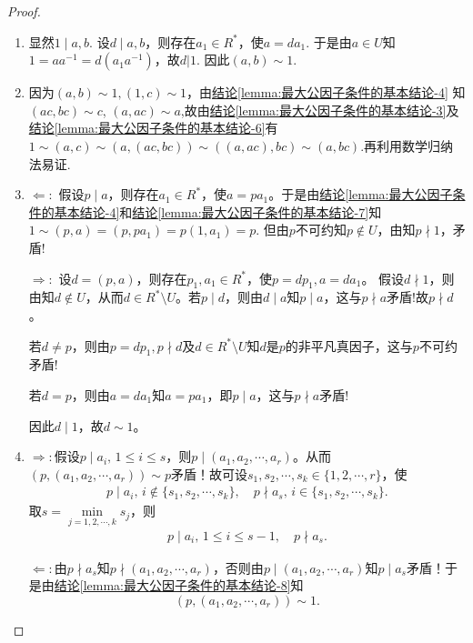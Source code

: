\documentclass[../../main.tex]{subfiles}%
\begin{document}
\begin{proof}
\begin{enumerate}[(1)]
\item 显然$1\mid a,b$. 设$d\mid a,b$，则存在$a_1\in R^*$，使$a=da_1$. 于是由$a\in U$知$1=aa^{-1}=d\left( a_1a^{-1} \right)$，故$d|1$. 因此$\left( a,b \right) \sim 1$.

\item 因为\( (a, b) \sim 1 ,(1,c)\sim 1\)，由\hyperref[lemma:最大公因子条件的基本结论-4]{结论\ref{lemma:最大公因子条件的基本结论-4}} 知 \( (ac, bc) \sim c \), \( (a, ac) \sim a \),故由\hyperref[lemma:最大公因子条件的基本结论-3]{结论\ref{lemma:最大公因子条件的基本结论-3}}及\hyperref[lemma:最大公因子条件的基本结论-6]{结论\ref{lemma:最大公因子条件的基本结论-6}}有 \( 1 \sim (a, c) \sim (a, (ac, bc)) \sim ((a, ac), bc) \sim (a, bc) \).再利用数学归纳法易证.

\item $\Longleftarrow:$ 假设$p \mid a$，则存在$a_1 \in R^*$，使$a = pa_1$。于是由\hyperref[lemma:最大公因子条件的基本结论-4]{结论\ref{lemma:最大公因子条件的基本结论-4}}和\hyperref[lemma:最大公因子条件的基本结论-7]{结论\ref{lemma:最大公因子条件的基本结论-7}}知
$1 \sim (p, a) = (p, pa_1) = p(1, a_1) = p.$
但由$p$不可约知$p \notin U$，由知$p \nmid 1$，矛盾!

$\Longrightarrow:$ 设$d = (p, a)$，则存在$p_1, a_1 \in R^*$，使$p = dp_1, a = da_1$。
假设$d \nmid 1$，则由知$d \notin U$，从而$d \in R^* \setminus U$。若$p \mid d$，则由$d \mid a$知$p \mid a$，这与$p \nmid a$矛盾!故$p \nmid d$。

若$d \neq p$，则由$p = dp_1, p \nmid d$及$d \in R^* \setminus U$知$d$是$p$的非平凡真因子，这与$p$不可约矛盾!

若$d = p$，则由$a = da_1$知$a = pa_1$，即$p \mid a$，这与$p \nmid a$矛盾!

因此$d \mid 1$，故$d \sim 1$。

\item $\Longrightarrow:$假设$p \mid a_i,\,1 \leqslant i \leqslant s$，则$p \mid (a_1,a_2,\cdots,a_r)$。从而$(p,(a_1,a_2,\cdots,a_r)) \sim p$矛盾！故可设$s_1,s_2,\cdots,s_k \in \{1,2,\cdots,r\}$，使
\begin{align*}
p \mid a_i,\,i \notin \{s_1,s_2,\cdots,s_k\}, \quad p \nmid a_s,\,i \in \{s_1,s_2,\cdots,s_k\}.
\end{align*}
取$s = \min\limits_{j=1,2,\cdots,k} s_j$，则
\begin{align*}
p \mid a_i,\,1 \leqslant i \leqslant s-1, \quad p \nmid a_s.
\end{align*}

$\Longleftarrow:$由$p \nmid a_s$知$p \nmid (a_1,a_2,\cdots,a_r)$，否则由$p \mid (a_1,a_2,\cdots,a_r)$知$p \mid a_s$矛盾！于是由\hyperref[lemma:最大公因子条件的基本结论-8]{结论\ref{lemma:最大公因子条件的基本结论-8}}知$$(p,(a_1,a_2,\cdots,a_r)) \sim 1.$$
\end{enumerate}
\end{proof}
\end{document}
